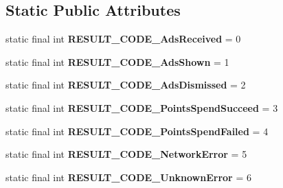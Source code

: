 \subsection*{Static Public Attributes}
\begin{DoxyCompactItemize}
\item 
\mbox{\label{classorg_1_1cocos2dx_1_1plugin_1_1AdsWrapper_aef0c22890584c26f0546dd0553659199}} 
static final int {\bfseries R\+E\+S\+U\+L\+T\+\_\+\+C\+O\+D\+E\+\_\+\+Ads\+Received} = 0
\item 
\mbox{\label{classorg_1_1cocos2dx_1_1plugin_1_1AdsWrapper_a62bdc9ff51cd6ebf1cdecc37d23da709}} 
static final int {\bfseries R\+E\+S\+U\+L\+T\+\_\+\+C\+O\+D\+E\+\_\+\+Ads\+Shown} = 1
\item 
\mbox{\label{classorg_1_1cocos2dx_1_1plugin_1_1AdsWrapper_a1c4fac003b49a1d9a250909a3c88383c}} 
static final int {\bfseries R\+E\+S\+U\+L\+T\+\_\+\+C\+O\+D\+E\+\_\+\+Ads\+Dismissed} = 2
\item 
\mbox{\label{classorg_1_1cocos2dx_1_1plugin_1_1AdsWrapper_a678916e149dd8275e0500859b30649c5}} 
static final int {\bfseries R\+E\+S\+U\+L\+T\+\_\+\+C\+O\+D\+E\+\_\+\+Points\+Spend\+Succeed} = 3
\item 
\mbox{\label{classorg_1_1cocos2dx_1_1plugin_1_1AdsWrapper_a4a15b5610f24d8fc2cb03750330d8b8a}} 
static final int {\bfseries R\+E\+S\+U\+L\+T\+\_\+\+C\+O\+D\+E\+\_\+\+Points\+Spend\+Failed} = 4
\item 
\mbox{\label{classorg_1_1cocos2dx_1_1plugin_1_1AdsWrapper_a831505fd57ddf3b88ec316b28d4faae4}} 
static final int {\bfseries R\+E\+S\+U\+L\+T\+\_\+\+C\+O\+D\+E\+\_\+\+Network\+Error} = 5
\item 
\mbox{\label{classorg_1_1cocos2dx_1_1plugin_1_1AdsWrapper_a55a206b4a9850b818418e3f3a79d584f}} 
static final int {\bfseries R\+E\+S\+U\+L\+T\+\_\+\+C\+O\+D\+E\+\_\+\+Unknown\+Error} = 6
\item 
\mbox{\label{classorg_1_1cocos2dx_1_1plugin_1_1AdsWrapper_adf3b1ccf1ea7301dffa92acadb7d9552}} 

\end{DoxyCompactItemize}
